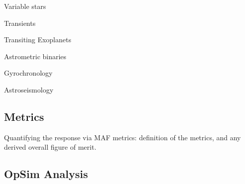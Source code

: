 
\item Variable stars


\item Transients

\item Transiting Exoplanets

\item Astrometric binaries

\item Gyrochronology

\item Astroseismology




\subsection{Metrics}
\label{sec:keyword:metrics}

Quantifying the response via MAF metrics: definition of the metrics,
and any derived overall figure of merit.



\subsection{OpSim Analysis}
\label{sec:keyword:analysis}

